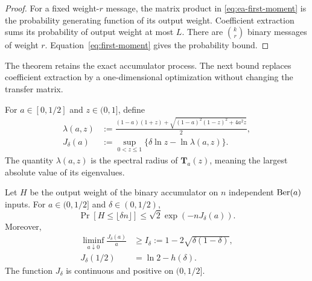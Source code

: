 \begin{proof}
For a fixed weight-$r$ message, the matrix product in
\eqref{eq:ea-first-moment} is the probability generating function of its
output weight.  Coefficient extraction sums its probability of output weight
at most $L$.  There are $\binom{k}{r}$ binary messages of weight $r$.
Equation~\eqref{eq:first-moment} gives the probability bound.
\end{proof}

The theorem retains the exact accumulator process.  The next bound replaces
coefficient extraction by a one-dimensional optimization without changing
the transfer matrix.

For $a\in[0,1/2]$ and $z\in(0,1]$, define
\begin{align}
 \lambda(a,z)
 &:=\frac{(1-a)(1+z)+
 \sqrt{(1-a)^2(1-z)^2+4a^2z}}{2},
 \label{eq:ea-spectral-radius}\\
 J_\delta(a)&:=
 \sup_{0<z\leq1}\{\delta\ln z-\ln\lambda(a,z)\}.
 \label{eq:ea-rate-function}
\end{align}
The quantity $\lambda(a,z)$ is the spectral radius of
$\mathbf T_a(z)$, meaning the largest absolute value of its eigenvalues.

\begin{lemma}
\label{lem:ea-lower-tail}
Let $H$ be the output weight of the binary accumulator on $n$ independent
$\operatorname{Ber}(a)$ inputs.  For $a\in(0,1/2]$ and $\delta\in(0,1/2)$,
\begin{equation}
 \Pr[H\leq\lfloor\delta n\rfloor]
 \leq\sqrt2\exp(-nJ_\delta(a)).
 \label{eq:ea-lower-tail}
\end{equation}
Moreover,
\begin{align}
 \liminf_{a\downarrow0}\frac{J_\delta(a)}a
 &\geq I_\delta:=1-2\sqrt{\delta(1-\delta)},
 \label{eq:ea-sparse-endpoint}\\
 J_\delta(1/2)&=\ln2-h(\delta).
 \label{eq:ea-dense-endpoint}
\end{align}
The function $J_\delta$ is continuous and positive on $(0,1/2]$.
\end{lemma}

